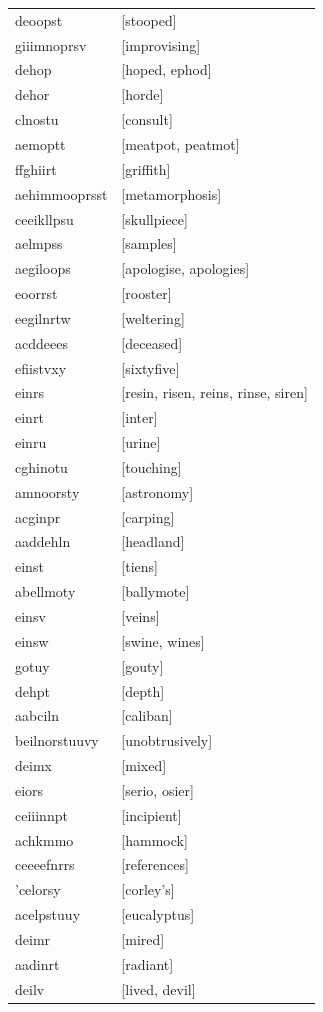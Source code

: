 \documentclass{article}
\begin{document}
\begin{tabular}{ll}
deoopst & [stooped] \\
giiimnoprsv & [improvising] \\
dehop & [hoped, ephod] \\
dehor & [horde] \\
clnostu & [consult] \\
aemoptt & [meatpot, peatmot] \\
ffghiirt & [griffith] \\
aehimmooprsst & [metamorphosis] \\
ceeikllpsu & [skullpiece] \\
aelmpss & [samples] \\
aegiloops & [apologise, apologies] \\
eoorrst & [rooster] \\
eegilnrtw & [weltering] \\
acddeees & [deceased] \\
efiistvxy & [sixtyfive] \\
einrs & [resin, risen, reins, rinse, siren] \\
einrt & [inter] \\
einru & [urine] \\
cghinotu & [touching] \\
amnoorsty & [astronomy] \\
acginpr & [carping] \\
aaddehln & [headland] \\
einst & [tiens] \\
abellmoty & [ballymote] \\
einsv & [veins] \\
einsw & [swine, wines] \\
gotuy & [gouty] \\
dehpt & [depth] \\
aabciln & [caliban] \\
beilnorstuuvy & [unobtrusively] \\
deimx & [mixed] \\
eiors & [serio, osier] \\
ceiiinnpt & [incipient] \\
achkmmo & [hammock] \\
ceeeefnrrs & [references] \\
'celorsy & [corley's] \\
acelpstuuy & [eucalyptus] \\
deimr & [mired] \\
aadinrt & [radiant] \\
deilv & [lived, devil] \\

\end{tabular}
\end{document}
